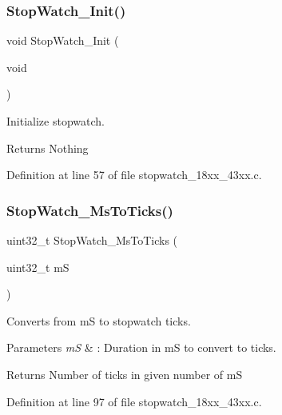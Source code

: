 \subsubsection{\texorpdfstring{Stop\+Watch\+\_\+\+Init()}{StopWatch\_Init()}}
{\footnotesize\ttfamily void Stop\+Watch\+\_\+\+Init (\begin{DoxyParamCaption}\item[{void}]{ }\end{DoxyParamCaption})}



Initialize stopwatch. 

\begin{DoxyReturn}{Returns}
Nothing 
\end{DoxyReturn}


Definition at line 57 of file stopwatch\+\_\+18xx\+\_\+43xx.\+c.

\mbox{\label{group___stop___watch_ga00f0c8411acd07344c7dd3cac8ec6d3e}} 
\subsubsection{\texorpdfstring{Stop\+Watch\+\_\+\+Ms\+To\+Ticks()}{StopWatch\_MsToTicks()}}
{\footnotesize\ttfamily uint32\+\_\+t Stop\+Watch\+\_\+\+Ms\+To\+Ticks (\begin{DoxyParamCaption}\item[{uint32\+\_\+t}]{mS }\end{DoxyParamCaption})}



Converts from mS to stopwatch ticks. 


\begin{DoxyParams}{Parameters}
{\em mS} & \+: Duration in mS to convert to ticks. \\
\hline
\end{DoxyParams}
\begin{DoxyReturn}{Returns}
Number of ticks in given number of mS 
\end{DoxyReturn}


Definition at line 97 of file stopwatch\+\_\+18xx\+\_\+43xx.\+c.

\mbox{\label{group___stop___watch_ga0dbab611d6cbdd4faad5018131aca140}} 
